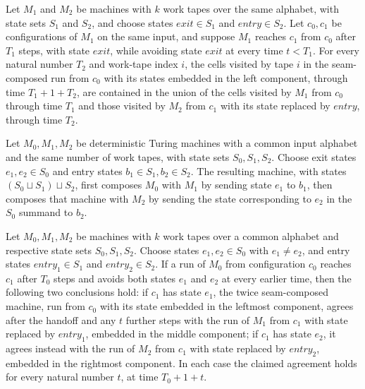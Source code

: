\begin{theorem}
\label{Turing.seamCompTM_visitedByTapeHead_ofCfg}
\leanok
{}
Let $M_1$ and $M_2$ be machines with $k$ work tapes over the same alphabet, with state
sets $S_1$ and $S_2$, and choose states $exit\in S_1$ and $entry\in S_2$. Let $c_0,c_1$
be configurations of $M_1$ on the same input, and suppose $M_1$ reaches $c_1$ from $c_0$
after $T_1$ steps, with state $exit$, while avoiding state $exit$ at every time $t<T_1$.
For every natural number $T_2$ and work-tape index $i$, the cells visited by tape $i$ in
the seam-composed run from $c_0$ with its states embedded in the left component, through
time $T_1+1+T_2$, are contained in the union of the cells visited by $M_1$ from $c_0$
through time $T_1$ and those visited by $M_2$ from $c_1$ with its state replaced by
$entry$, through time $T_2$.
\end{theorem}

\begin{definition}
\leanok
{}
Let $M_0,M_1,M_2$ be deterministic Turing machines with a common input alphabet and the
same number of work tapes, with state sets $S_0,S_1,S_2$. Choose exit states $e_1,e_2\in
S_0$ and entry states $b_1\in S_1,b_2\in S_2$. The resulting machine, with states
$(S_0\sqcup S_1)\sqcup S_2$, first composes $M_0$ with $M_1$ by sending state $e_1$ to
$b_1$, then composes that machine with $M_2$ by sending the state corresponding to $e_2$
in the $S_0$ summand to $b_2$.
\end{definition}

\begin{theorem}
\leanok
{}
Let $M_0,M_1,M_2$ be machines with $k$ work tapes over a common alphabet and respective
state sets $S_0,S_1,S_2$. Choose states $e_1,e_2\in S_0$ with $e_1\ne e_2$, and entry
states $entry_1\in S_1$ and $entry_2\in S_2$. If a run of $M_0$ from configuration $c_0$
reaches $c_1$ after $T_0$ steps and avoids both states $e_1$ and $e_2$ at every earlier
time, then the following two conclusions hold: if $c_1$ has state $e_1$, the twice
seam-composed machine, run from $c_0$ with its state embedded in the leftmost component,
agrees after the handoff and any $t$ further steps with the run of $M_1$ from $c_1$ with
state replaced by $entry_1$, embedded in the middle component; if $c_1$ has state $e_2$,
it agrees instead with the run of $M_2$ from $c_1$ with state replaced by $entry_2$,
embedded in the rightmost component. In each case the claimed agreement holds for every
natural number $t$, at time $T_0+1+t$.
\end{theorem}

